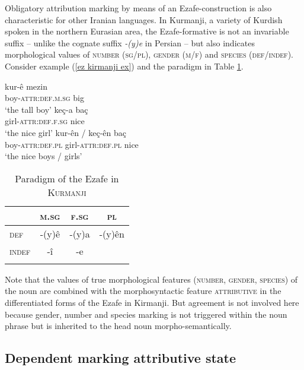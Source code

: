 Obligatory attribution marking by means of an Ezafe-construction is also characteristic for other Iranian languages. In Kurmanji, a variety of Kurdish spoken in the northern Eurasian area, the Ezafe-formative is not an invariable suffix – unlike the cognate suffix \textit{-(y)e} in Persian – but also indicates morphological values of \textsc{number} (\textsc{sg\fshyp{}pl}), \textsc{gender} (\textsc{m\fshyp{}f}) and \textsc{species} (\textsc{def\fshyp{}indef}). Consider example (\ref{ez kirmanji ex}) and the paradigm in Table \ref{ez kirmanji paradigm}. 
\begin{exe}
\ex
{} \label{ez kirmanji ex}%
\begin{xlist}
\ex
\gll	kur-\^e mezin\\
	boy-\textsc{attr:def.m.sg} big\\
\glt	‘the tall boy’
\ex	
\gll	ke\c{c}-a ba\c{c}\\
	girl-\textsc{attr:def.f.sg} nice\\
\glt	‘the nice girl’
\ex	
\gll	kur-\^en / ke\c{c}-\^en ba\c{c}\\
	boy-\textsc{attr:def.pl} {} girl-\textsc{attr:def.pl} nice\\
\glt	‘the nice boys / girls’ %
\end{xlist}
\end{exe}
\begin{table}
\begin{tabular}{l | ccc}
\lsptoprule
		&\textsc{m.sg}	&\textsc{f.sg}		&\textsc{pl}\\
\midrule
\textsc{def}	&-(y)\^{e}	&-(y)a			&-(y)\^{e}n\\
\textsc{indef}	&-î		&-e				&\\
\lspbottomrule
\end{tabular}
\caption[Paradigm of the Ezafe in \textsc{Kurmanji}]{Paradigm of the Ezafe in \textsc{Kurmanji} \citep{schroder2002}} 
\label{ez kirmanji paradigm}
\end{table}
Note that the values of true morphological features (\textsc{number, gender, species}) of the noun are combined with the morphosyntactic feature \textsc{attributive} in the differentiated forms of the Ezafe in Kirmanji. But agreement is not involved here because gender, number and species marking is not triggered within the noun phrase but is inherited to the head noun morpho-semantically.

\subsection{Dependent marking attributive state}\label{dep-marking state}

